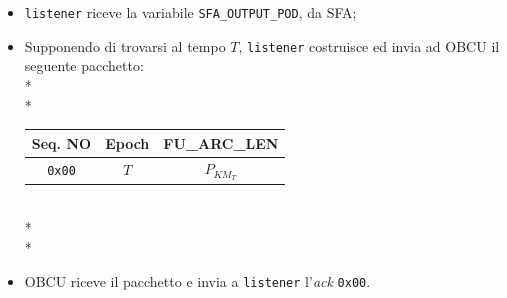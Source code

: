 \begin{itemize}
	\item \texttt{listener} riceve la variabile \texttt{SFA\_OUTPUT\_POD}, da SFA;
	\item Supponendo di trovarsi al tempo $T$, \texttt{listener} costruisce ed invia ad OBCU il seguente pacchetto:\\*\\*
		\begin{tabular}{|c|c|c|}
		\hline 
		\textbf{Seq. NO} & \textbf{Epoch} & \textbf{FU\_ARC\_LEN} \\ 
		\hline 
		\texttt{0x00} & $T$ & $P_{KM_T}$ \\ 
		\hline 
	\end{tabular}\\*\\*
	\item OBCU riceve il pacchetto e invia a \texttt{listener} l'\emph{ack} \texttt{0x00}.
\end{itemize}
